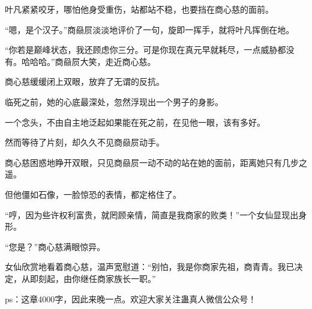 \begin{this_body}
叶凡紧紧咬牙，哪怕他身受重伤，站都站不稳，也要挡在商心慈的面前。

“嗯，是个汉子。”商赑屃淡淡地评价了一句，旋即一挥手，就将叶凡挥倒在地。

“你若是巅峰状态，我还顾虑你三分。可是你现在真元早就耗尽，一点威胁都没有。哈哈哈。”商赑屃大笑，走近商心慈。

商心慈缓缓闭上双眼，放弃了无谓的反抗。

临死之前，她的心底最深处，忽然浮现出一个男子的身影。

一个念头，不由自主地泛起如果能在死之前，在见他一眼，该有多好。

然而等待了片刻，却久久不见商赑屃动手。

商心慈困惑地睁开双眼，只见商赑屃一动不动的站在她的面前，距离她只有几步之遥。

但他僵如石像，一脸惊恐的表情，都定格住了。

“哼，因为些许权利富贵，就罔顾亲情，简直是我商家的败类！”一个女仙显现出身形。

“您是？”商心慈满眼惊异。

女仙欣赏地看着商心慈，温声宽慰道：“别怕，我是你商家先祖，商青青。我已决定，从即刻起，由你继任商家族长一职。”

ps：这章4000字，因此来晚一点。欢迎大家关注蛊真人微信公众号！

\end{this_body}


